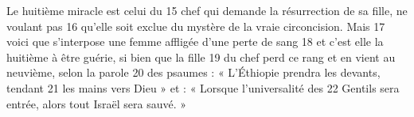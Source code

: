 Le huitième miracle est celui du	 
15	 	chef qui demande la résurrection de sa fille, ne voulant pas	 
16	 	qu'elle soit exclue du mystère de la vraie circoncision. Mais	 
17	 	voici que s'interpose une femme affligée d'une perte de sang	 
18	 	et c'est elle la huitième à être guérie, si bien que la fille	 
19	 	du chef perd ce rang et en vient au neuvième, selon la parole	 
20	 	des psaumes : « L'Éthiopie prendra les devants, tendant	 
21	 	les mains vers Dieu » et : « Lorsque l'universalité des	 
22	 	Gentils sera entrée, alors tout Israël sera sauvé. »
